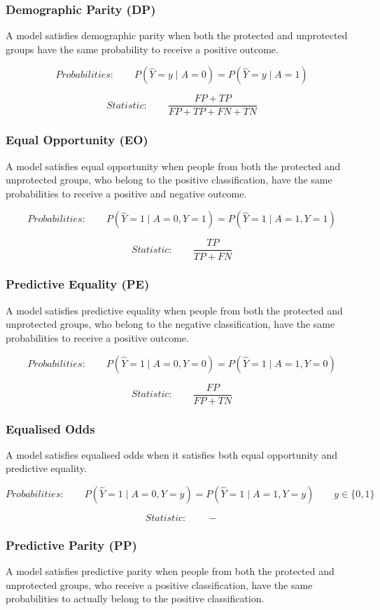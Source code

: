 \subsubsection{Demographic Parity (DP)}
A model satisfies demographic parity when both the protected and unprotected groups have the same probability to receive a positive outcome.

\[
Probabilities:\qquad
P(\hat{Y}=y\mid A=0)=P(\hat{Y}=y\mid A=1)
\]

\[
Statistic:\qquad
\frac{FP+TP}{FP+TP+FN+TN}
\]

\subsubsection{Equal Opportunity (EO)}
A model satisfies equal opportunity when people from both the protected and unprotected groups, who belong to the positive classification, have the same probabilities to receive a positive and negative outcome.

\[
Probabilities:\qquad
P(\hat{Y}=1\mid A=0, Y=1)=P(\hat{Y}=1\mid A=1, Y=1)
\]

\[
Statistic:\qquad
\frac{TP}{TP+FN}
\]

\subsubsection{Predictive Equality (PE)}
A model satisfies predictive equality when people from both the protected and unprotected groups, who belong to the negative classification, have the same probabilities to receive a positive outcome.

\[
Probabilities:\qquad
P(\hat{Y}=1\mid A=0, Y=0)=P(\hat{Y}=1\mid A=1, Y=0)
\]

\[
Statistic:\qquad
\frac{FP}{FP+TN}
\]

\subsubsection{Equalised Odds}
A model satisfies equalised odds when it satisfies both equal opportunity and predictive equality.

\[
Probabilities:\qquad
P(\hat{Y}=1\mid A=0, Y=y)=P(\hat{Y}=1\mid A=1, Y=y) \qquad y \in \{0,1\}
\]

\[
Statistic:\qquad
-
\]

\subsubsection{Predictive Parity (PP)}
A model satisfies predictive parity when people from both the protected and unprotected groups, who receive a positive classification, have the same probabilities to actually belong to the positive classification.

